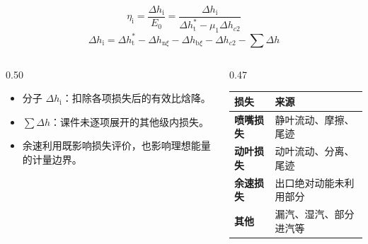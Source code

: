\begin{frame}[t,shrink]{}
$$
\eta_{\mathrm{i}}
=\frac{\Delta h_{\mathrm{i}}}{E_0}
=\frac{\Delta h_{\mathrm{i}}}
{\Delta h_{\mathrm{t}}^*-\mu_1\Delta h_{c2}}
$$
$$
\Delta h_{\mathrm{i}}
=\Delta h_{\mathrm{t}}^*
-\Delta h_{\mathrm{n}\xi}
-\Delta h_{\mathrm{b}\xi}
-\Delta h_{c2}
-\sum\Delta h
$$
\begin{columns}[T,onlytextwidth]
\begin{column}{0.50\textwidth}
  \begin{itemize}
    \item 分子 \(\Delta h_{\mathrm{i}}\)：扣除各项损失后的有效比焓降。
    \item \(\sum\Delta h\)：课件未逐项展开的其他级内损失。
    \item 余速利用既影响损失评价，也影响理想能量的计量边界。
  \end{itemize}
\end{column}
\begin{column}{0.47\textwidth}
  \begin{smalltab}
  \begin{tabularx}{\linewidth}{@{}>{\bfseries}p{25mm}X@{}}
    \toprule
    损失 & 来源\\
    \midrule
    喷嘴损失 & 静叶流动、摩擦、尾迹\\
    动叶损失 & 动叶流动、分离、尾迹\\
    余速损失 & 出口绝对动能未利用部分\\
    其他 & 漏汽、湿汽、部分进汽等\\
    \bottomrule
  \end{tabularx}
  \end{smalltab}
\end{column}
\end{columns}
\end{frame}


